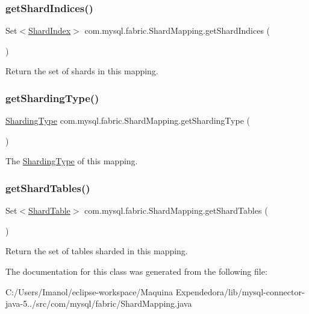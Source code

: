 \subsubsection{\texorpdfstring{get\+Shard\+Indices()}{getShardIndices()}}
{\footnotesize\ttfamily Set$<$\mbox{\hyperlink{classcom_1_1mysql_1_1fabric_1_1_shard_index}{Shard\+Index}}$>$ com.\+mysql.\+fabric.\+Shard\+Mapping.\+get\+Shard\+Indices (\begin{DoxyParamCaption}{ }\end{DoxyParamCaption})}

Return the set of shards in this mapping. \mbox{\label{classcom_1_1mysql_1_1fabric_1_1_shard_mapping_a576cf21291d18696ee2ca479861fd099}} 
\subsubsection{\texorpdfstring{get\+Sharding\+Type()}{getShardingType()}}
{\footnotesize\ttfamily \mbox{\hyperlink{enumcom_1_1mysql_1_1fabric_1_1_sharding_type}{Sharding\+Type}} com.\+mysql.\+fabric.\+Shard\+Mapping.\+get\+Sharding\+Type (\begin{DoxyParamCaption}{ }\end{DoxyParamCaption})}

The \mbox{\hyperlink{enumcom_1_1mysql_1_1fabric_1_1_sharding_type}{Sharding\+Type}} of this mapping. \mbox{\label{classcom_1_1mysql_1_1fabric_1_1_shard_mapping_acce92dfd014b358a9873a90a23a7a89c}} 
\subsubsection{\texorpdfstring{get\+Shard\+Tables()}{getShardTables()}}
{\footnotesize\ttfamily Set$<$\mbox{\hyperlink{classcom_1_1mysql_1_1fabric_1_1_shard_table}{Shard\+Table}}$>$ com.\+mysql.\+fabric.\+Shard\+Mapping.\+get\+Shard\+Tables (\begin{DoxyParamCaption}{ }\end{DoxyParamCaption})}

Return the set of tables sharded in this mapping. 

The documentation for this class was generated from the following file\+:\begin{DoxyCompactItemize}
\item 
C\+:/\+Users/\+Imanol/eclipse-\/workspace/\+Maquina Expendedora/lib/mysql-\/connector-\/java-\/5../src/com/mysql/fabric/Shard\+Mapping.\+java\end{DoxyCompactItemize}
